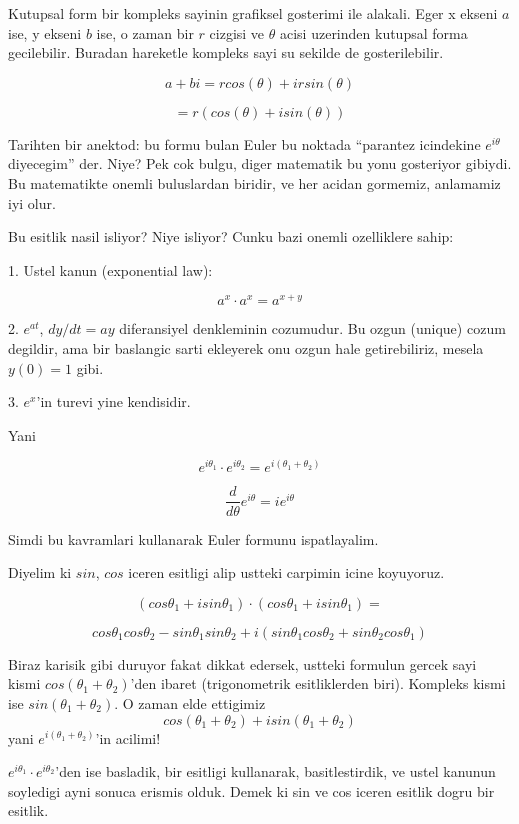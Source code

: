 \documentclass[12pt,fleqn]{article}
\begin{document}
Kutupsal form bir kompleks sayinin grafiksel gosterimi ile alakali. Eger x
ekseni $a$ ise, y ekseni $b$ ise, o zaman bir $r$ cizgisi ve $\theta$ acisi
uzerinden kutupsal forma gecilebilir. Buradan hareketle kompleks sayi su
sekilde de gosterilebilir. 

\[ a+bi = rcos(\theta) + irsin(\theta) \]

\[ = r (cos(\theta) + isin(\theta)) \]

Tarihten bir anektod: bu formu bulan Euler bu noktada ``parantez icindekine
$e^{i\theta}$ diyecegim'' der. Niye? Pek cok bulgu, diger matematik bu yonu
gosteriyor gibiydi. Bu matematikte onemli buluslardan biridir, ve her
acidan gormemiz, anlamamiz iyi olur. 

Bu esitlik nasil isliyor? Niye isliyor? Cunku bazi onemli ozelliklere sahip:

1. Ustel kanun (exponential law):

\[ a^x \cdot a^x = a^{x+y} \]

2. $e^{at}$, $dy/dt = ay$ diferansiyel denkleminin cozumudur. Bu ozgun
(unique) cozum degildir, ama bir baslangic sarti ekleyerek onu ozgun hale
getirebiliriz, mesela $y(0)=1$ gibi.

3. $e^x$'in turevi yine kendisidir. 

Yani

\[ e^{i\theta_1} \cdot  e^{i\theta_2} = e^{i(\theta_1 + \theta_2)}\]

\[ \frac{d}{d\theta} e^{i\theta} = i e^{i\theta} \]

Simdi bu kavramlari kullanarak Euler formunu ispatlayalim. 

Diyelim ki $sin$, $cos$ iceren esitligi alip ustteki carpimin icine
koyuyoruz.

\[ 
(cos\theta_1 + isin\theta_1) \cdot (cos\theta_1 + isin\theta_1) =
\] 

\[  
cos\theta_1cos\theta_2 - sin\theta_1sin\theta_2 +
i(sin\theta_1cos\theta_2 + sin\theta_2cos\theta_1 )
\] 

Biraz karisik gibi duruyor fakat dikkat edersek, ustteki formulun gercek
sayi kismi $cos(\theta_1 + \theta_2)$'den ibaret (trigonometrik esitliklerden biri). 
Kompleks kismi ise $sin(\theta_1 + \theta_2)$. O zaman elde ettigimiz \[
cos(\theta_1+\theta_2) + isin(\theta_1+\theta_2) \] 
yani $e^{i(\theta_1+\theta_2)}$'in acilimi!

$e^{i\theta_1} \cdot e^{i\theta_2}$'den ise basladik, bir esitligi kullanarak, basitlestirdik, 
ve ustel kanunun soyledigi ayni sonuca erismis olduk. Demek ki sin ve cos 
iceren esitlik dogru bir esitlik.
\end{document}
